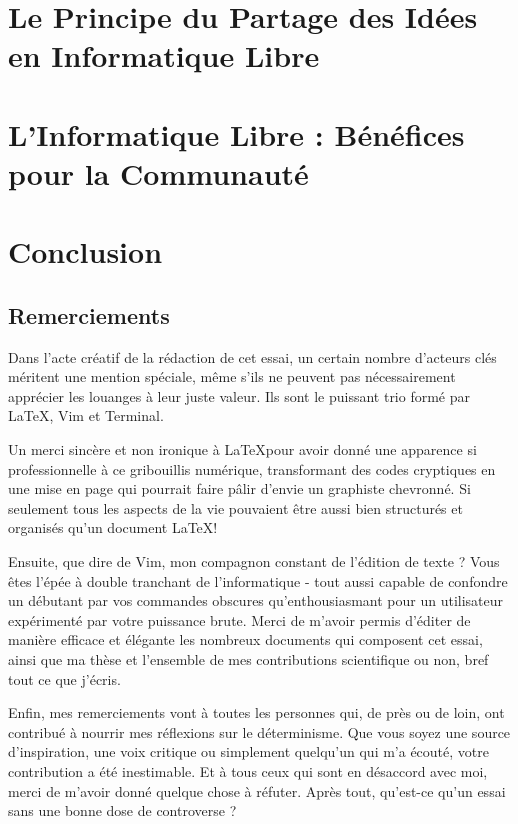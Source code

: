 \documentclass[10pt]{book}
\begin{document}
\chapter{Le Principe du Partage des Idées en Informatique Libre}

\chapter{L'Informatique Libre : Bénéfices pour la Communauté}


\chapter*{Conclusion}


\section*{Remerciements}
Dans l'acte créatif de la rédaction de cet essai, un certain nombre d'acteurs clés méritent une mention spéciale, même s'ils ne peuvent pas nécessairement apprécier les louanges à leur juste valeur. Ils sont le puissant trio formé par \LaTeX, Vim et Terminal.

Un merci sincère et non ironique à \LaTeX pour avoir donné une apparence si professionnelle à ce gribouillis numérique, transformant des codes cryptiques en une mise en page qui pourrait faire pâlir d'envie un graphiste chevronné. Si seulement tous les aspects de la vie pouvaient être aussi bien structurés et organisés qu'un document \LaTeX !

Ensuite, que dire de Vim, mon compagnon constant de l'édition de texte ? Vous êtes l'épée à double tranchant de l'informatique - tout aussi capable de confondre un débutant par vos commandes obscures qu'enthousiasmant pour un utilisateur expérimenté par votre puissance brute. Merci de m'avoir permis d'éditer de manière efficace et élégante les nombreux documents qui composent cet essai, ainsi que ma thèse et l'ensemble de mes contributions scientifique ou non, bref tout ce que j'écris.


Enfin, mes remerciements vont à toutes les personnes qui, de près ou de loin, ont contribué à nourrir mes réflexions sur le déterminisme. Que vous soyez une source d'inspiration, une voix critique ou simplement quelqu'un qui m'a écouté, votre contribution a été inestimable. Et à tous ceux qui sont en désaccord avec moi, merci de m'avoir donné quelque chose à réfuter. Après tout, qu'est-ce qu'un essai sans une bonne dose de controverse ?
\end{document}
